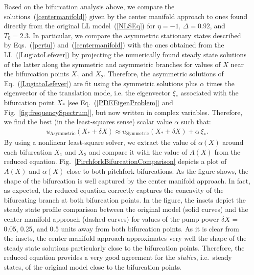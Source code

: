 Based on the bifurcation analysis above, we compare the solutions~(\ref{centermanifold}) given by the center manifold approach to ones found directly from the original LL model~(\ref{NLSEq}) 
for $\eta = -1$, $\Delta = 0.92$, and $T_0 = 2.3$.  
%
In particular, we compare the asymmetric stationary states described by 
Eqs.~(\ref{pertu}) and~(\ref{centermanifold}) with the ones obtained from 
the LL~(\ref{LugiatoLefever})
by projecting the numerically found steady state solutions of
the latter along the symmetric and asymmetric branches for values 
of $X$ near the bifurcation points $X_1$ and $X_2$.  
%
Therefore, the asymmetric solutions of Eq.~(\ref{LugiatoLefever}) are 
fit using the symmetric solutions plus $\alpha$ times the
eigenvector of the translation mode, i.e. the eigenvector $\xi_*$ 
associated with the bifurcation point $X_*$ [see Eq.~(\ref{PDEEigenProblem}) 
and Fig.~\ref{fig:frequencySpectrum}], but now written in complex variables.
%
Therefore, we find the best (in the least-squares sense) scalar
value $\alpha$ such that:
%
\begin{align}
u_{\mathrm{Asymmetric} }(X_* + \delta X)\approx u_{\mathrm{Symmetric} }(X_* + \delta X) + \alpha\, \xi_*.
\label{PDEfit}
\end{align}
%
By using a nonlinear least-square solver, we extract the value of 
$\alpha(X)$ around each bifurcation $X_1$ and $X_2$ and compare it
with the value of $A(X)$ from the reduced equation.
%
Fig.~\ref{PirchforkBifurcationComparison} depicts a plot of
$A(X)$ and $\alpha(X)$ close to both pitchfork bifurcations.  
As the figure shows, the shape of the bifurcation is 
well captured by the center manifold approach. In fact, as expected, 
the reduced equation correctly captures the concavity of the 
bifurcating branch at both bifurcation points.
%
In the figure, the insets depict the steady state profile comparison 
between the original model (solid curves) and the center manifold approach (dashed curves) for values
of the pump power $\delta X$ = 0.05, 0.25, and 0.5 units away
from both bifurcation points.
%
As it is clear from the insets, the center manifold approach approximates
very well the shape of the steady state solutions particularly close
to the bifurcation points.
%
Therefore, the reduced equation provides a very good agreement 
for the {\em statics}, i.e.~steady states, of the original model
close to the bifurcation points.

